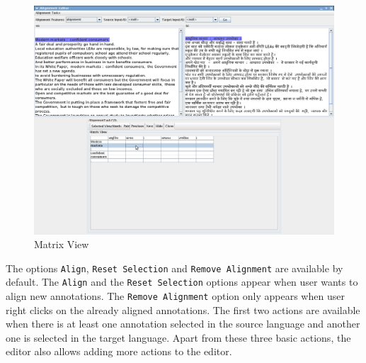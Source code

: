 \begin{figure}[ht]
\begin{center}
\includegraphics[width=\textwidth]{matrix-view.png}
\caption{Matrix View}
\label{fig:matrix-view}
\end{center}
\end{figure}



The options {\tt Align}, {\tt Reset Selection} and {\tt Remove Alignment} are 
available by default. The {\tt Align} and the {\tt Reset Selection} options 
appear when user wants to align new annotations.  The {\tt Remove Alignment} 
option only appears when user right clicks on the already aligned annotations.
The first two actions are available when there is at least one annotation 
selected in the source language and another one is selected in the target 
language.  Apart from these three basic actions, the editor also allows adding 
more actions to the editor.

